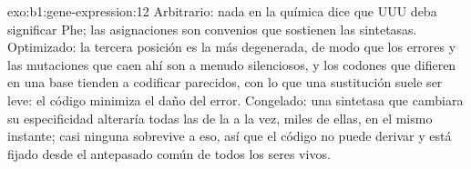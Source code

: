 \begin{solution}{exo:b1:gene-expression:12}
Arbitrario: nada en la química dice que UUU deba significar Phe; las
asignaciones son convenios que sostienen las sintetasas. Optimizado: la
tercera posición es la más degenerada, de modo que los errores y las
mutaciones que caen ahí son a menudo silenciosos, y los codones que difieren
en una base tienden a codificar  parecidos, con lo que una
sustitución suele ser leve: el código minimiza el daño del error. Congelado:
una sintetasa que cambiara su especificidad alteraría todas las  de
la  a la vez, miles de ellas, en el mismo instante; casi ninguna
 sobrevive a eso, así que el código no puede derivar y está fijado
desde el antepasado común de todos los seres vivos.
\end{solution}

